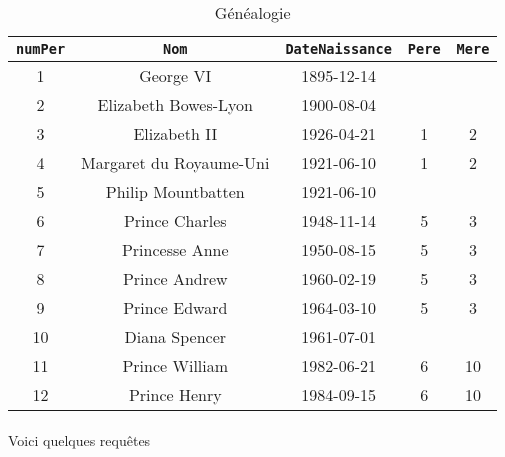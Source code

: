 \documentclass{report}
\begin{document}
\begin{table}[H]
	\center
	\begin{tabular}{|c|c|c|c|c|}
		\hline
		\verb+numPer+ & \verb+Nom+ & \verb+DateNaissance+ & \verb+Pere+ & \verb+Mere+ \\
		\hline
		1 & George VI & 1895-12-14 & & \\
		\hline
		2 & Elizabeth Bowes-Lyon & 1900-08-04 & & \\
		\hline
		3 & Elizabeth II & 1926-04-21 & 1 & 2 \\
		\hline
		4 & Margaret du Royaume-Uni & 1921-06-10 & 1 & 2 \\
		\hline
		5 & Philip Mountbatten & 1921-06-10 & & \\
		\hline
		6 & Prince Charles & 1948-11-14 & 5 & 3 \\
		\hline
		7 & Princesse Anne & 1950-08-15 & 5 & 3 \\
		\hline
		8 & Prince Andrew & 1960-02-19 & 5 & 3 \\
		\hline
		9 & Prince Edward & 1964-03-10 & 5 & 3 \\
		\hline
		10 & Diana Spencer & 1961-07-01 & & \\ 
		\hline
		11 & Prince William & 1982-06-21 & 6 & 10 \\
		\hline
		12 & Prince Henry & 1984-09-15 & 6 & 10 \\
		\hline
	\end{tabular}
	\caption{Généalogie}
\end{table}

\paragraph{}Voici quelques requêtes
\end{document}

